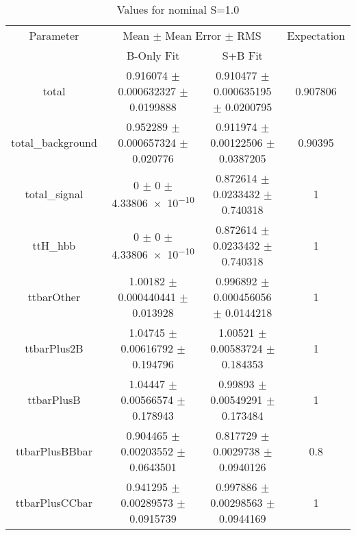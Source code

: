 \begin{table}
\centering
\caption{Values for nominal S=1.0}
\begin{tabular}{cccc}
\toprule
Parameter & \multicolumn{2}{c}{Mean $\pm$ Mean Error $\pm$ RMS} & Expectation\\
 & B-Only Fit & S+B Fit & \\
\midrule
total & \num{0.916074} $\pm$ \num{0.000632327} $\pm$ \num{0.0199888} & \num{0.910477} $\pm$ \num{0.000635195} $\pm$ \num{0.0200795} & \num{0.907806}\\
total\_background & \num{0.952289} $\pm$ \num{0.000657324} $\pm$ \num{0.020776} & \num{0.911974} $\pm$ \num{0.00122506} $\pm$ \num{0.0387205} & \num{0.90395}\\
total\_signal & \num{0} $\pm$ \num{0} $\pm$ \num{4.33806e-10} & \num{0.872614} $\pm$ \num{0.0233432} $\pm$ \num{0.740318} & \num{1}\\
ttH\_hbb & \num{0} $\pm$ \num{0} $\pm$ \num{4.33806e-10} & \num{0.872614} $\pm$ \num{0.0233432} $\pm$ \num{0.740318} & \num{1}\\
ttbarOther & \num{1.00182} $\pm$ \num{0.000440441} $\pm$ \num{0.013928} & \num{0.996892} $\pm$ \num{0.000456056} $\pm$ \num{0.0144218} & \num{1}\\
ttbarPlus2B & \num{1.04745} $\pm$ \num{0.00616792} $\pm$ \num{0.194796} & \num{1.00521} $\pm$ \num{0.00583724} $\pm$ \num{0.184353} & \num{1}\\
ttbarPlusB & \num{1.04447} $\pm$ \num{0.00566574} $\pm$ \num{0.178943} & \num{0.99893} $\pm$ \num{0.00549291} $\pm$ \num{0.173484} & \num{1}\\
ttbarPlusBBbar & \num{0.904465} $\pm$ \num{0.00203552} $\pm$ \num{0.0643501} & \num{0.817729} $\pm$ \num{0.0029738} $\pm$ \num{0.0940126} & \num{0.8}\\
ttbarPlusCCbar & \num{0.941295} $\pm$ \num{0.00289573} $\pm$ \num{0.0915739} & \num{0.997886} $\pm$ \num{0.00298563} $\pm$ \num{0.0944169} & \num{1}\\
\bottomrule
\end{tabular}
\end{table}